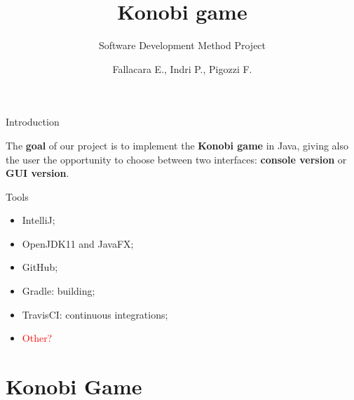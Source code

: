 \documentclass{beamer}
\title{Konobi game}
\subtitle{Software Development Method Project}
\author{Fallacara E., Indri P., Pigozzi F.}
\date{}
\begin{document}
	\setcounter{showSlideNumbers}{0}

	\frame{\titlepage}

	\setcounter{framenumber}{0}
	\setcounter{showSlideNumbers}{1}

  

  \begin{frame}{Introduction}

    \begin{tcolorbox}[colback=red!90!black!10]
      The \textbf{goal} of our project is to implement the \textbf{Konobi game} in Java, giving also the user the opportunity to choose between two interfaces: \textbf{console version} or \textbf{GUI version}.
    \end{tcolorbox}

    \vspace{1em}

    \begin{block}{Tools}
      \begin{itemize}
        \item IntelliJ;
        \item OpenJDK11 and JavaFX;
        \item GitHub;
        \item Gradle: building;
        \item TravisCI: continuous integrations;
        \item \textcolor{red}{Other?}
      \end{itemize}
    \end{block}

  \end{frame}


\section{Konobi Game}
\end{document}

